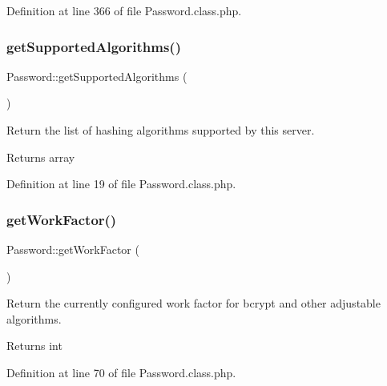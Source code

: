 Definition at line 366 of file Password.\+class.\+php.

\mbox{\label{classPassword_a4983366e7b062e052e6d9f716aa3e59c}} 
\subsubsection{\texorpdfstring{get\+Supported\+Algorithms()}{getSupportedAlgorithms()}}
{\footnotesize\ttfamily Password\+::get\+Supported\+Algorithms (\begin{DoxyParamCaption}{ }\end{DoxyParamCaption})}



Return the list of hashing algorithms supported by this server. 

\begin{DoxyReturn}{Returns}
array 
\end{DoxyReturn}


Definition at line 19 of file Password.\+class.\+php.

\mbox{\label{classPassword_a2c41d8ed7334ffeef9a0b2778b86d8f7}} 
\subsubsection{\texorpdfstring{get\+Work\+Factor()}{getWorkFactor()}}
{\footnotesize\ttfamily Password\+::get\+Work\+Factor (\begin{DoxyParamCaption}{ }\end{DoxyParamCaption})}



Return the currently configured work factor for bcrypt and other adjustable algorithms. 

\begin{DoxyReturn}{Returns}
int 
\end{DoxyReturn}


Definition at line 70 of file Password.\+class.\+php.

\mbox{\label{classPassword_a8f65e4dcd66bdf6507db9e09c05d9932}} 
